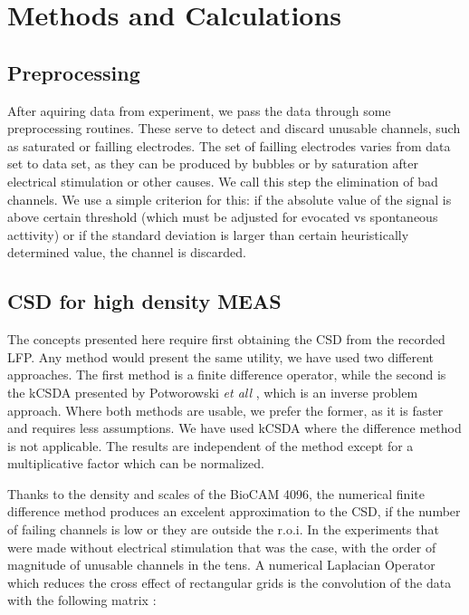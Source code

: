 \documentclass[12pt]{article}
\begin{document}
\section{Methods and Calculations}

\subsection{Preprocessing}

After aquiring data from experiment, we pass the data through some preprocessing
routines. These serve to detect and discard unusable channels,
such as saturated or failling electrodes. The
set of failling electrodes varies from data set to data set,
as they can be produced by bubbles or by saturation after electrical stimulation
or other causes. 
We call this step the elimination of bad channels. We use a simple criterion for this:
if the absolute value of the signal is above certain threshold (which must be
adjusted for evocated vs spontaneous acttivity) or if the standard deviation is
larger than certain heuristically determined value, the channel is discarded.



\subsection{CSD for high density MEAS}

The concepts presented here require first obtaining the CSD from the recorded LFP. Any method would present the same utility, we have used two different
approaches. The first method is a  finite difference operator, while the second is the kCSDA presented by Potworowski \emph{et all} \cite{Potworowski2011}, which is an inverse problem approach.  Where both methods are usable, we prefer the former,
as it is faster and requires less assumptions.
We have used kCSDA where
the difference method is not applicable. The results are
independent of the method except for a multiplicative factor which
can be normalized.

Thanks to the density and scales of the BioCAM 4096,
the numerical finite difference method
produces an excelent approximation to the CSD,
if the number of failing channels is low or
they are outside the r.o.i.
In the experiments that were made without electrical stimulation that was the case,
with the order of magnitude of unusable channels in the tens.
A  numerical Laplacian Operator which reduces the cross effect of rectangular grids is the convolution of the data with the following matrix \cite{Lindberg90}:
\end{document}
